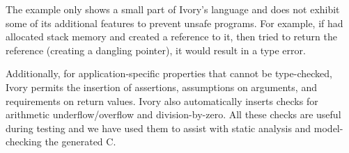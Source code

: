 The example only shows a small part of Ivory's language and does not exhibit
some of its additional features to prevent unsafe programs.  For example, if
 had allocated stack memory and created a reference to it, then tried
to return the reference (creating a dangling pointer), it would result in a type
error.

Additionally, for application-specific properties that cannot be type-checked,
Ivory permits the insertion of assertions, assumptions on arguments, and
requirements on return values.  Ivory also automatically inserts checks for
arithmetic underflow/overflow and division-by-zero.  All these checks are useful
during testing and we have used them to assist with static analysis and
model-checking the generated C.










